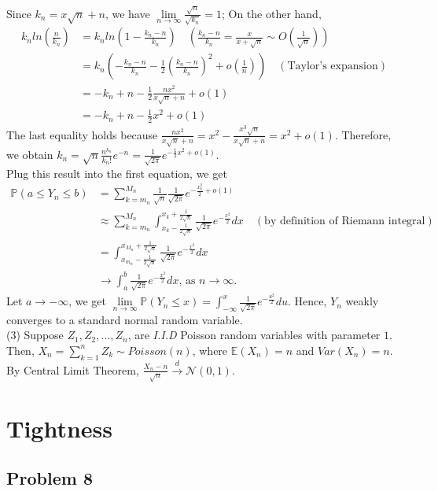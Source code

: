 \documentclass[12pt]{article}
\begin{document}
Since $k_{n}=x\sqrt{n}+n$, we have $\lim\limits_{n\rightarrow\infty}\frac{\sqrt{n}}{\sqrt{k_{n}}}=1$; On the other hand,
\begin{align*}
	k_{n}ln(\frac{n}{k_{n}})&=k_{n}ln(1-\frac{k_{n}-n}{k_{n}})\quad(\frac{k_{n}-n}{k_{n}}=\frac{x}{x+\sqrt{n}}\sim O(\frac{1}{\sqrt{n}}))\\
	&=k_{n}(-\frac{k_{n}-n}{k_{n}}-\frac{1}{2}(\frac{k_{n}-n}{k_{n}})^{2}+o(\frac{1}{n}))\quad(\text{Taylor's expansion})\\
	&=-k_{n}+n-\frac{1}{2}\frac{n x^2}{x\sqrt{n}+n}+o(1)\\
	&=-k_{n}+n-\frac{1}{2}x^2+o(1)
\end{align*}
The last equality holds because $\frac{nx^2}{x\sqrt{n}+n}=x^2-\frac{x^3\sqrt{n}}{x\sqrt{n}+n}=x^2+o(1)$. Therefore, we obtain $k_{n}=\sqrt{n}\frac{n^{k_{n}}}{k_{n}!}e^{-n}=\frac{1}{\sqrt{2\pi}}e^{-\frac{1}{2}x^2+o(1)}$.\\
Plug this result into the first equation, we get
\begin{align*}
\mathbb{P}(a\leqslant Y_{n}\leqslant b)&=\sum_{k=m_{n}}^{M_{n}}\frac{1}{\sqrt{n}}\frac{1}{\sqrt{2\pi}}e^{-\frac{x_{k}^2}{2}+o(1)} \\
&\approx \sum_{k=m_{n}}^{M_{n}}\int_{x_{k}-\frac{1}{2\sqrt{n}}}^{x_{k}+\frac{1}{2\sqrt{n}}} \frac{1}{\sqrt{2\pi}}e^{-\frac{x^2}{2}}dx\quad(\text{by definition of Riemann integral})\\
	&=\int_{x_{m_{n}}-\frac{1}{2\sqrt{n}}}^{x_{M_{n}}+\frac{1}{2\sqrt{n}}} \frac{1}{\sqrt{2\pi}}e^{-\frac{x^2}{2}}dx\\
	& \rightarrow \int_{a}^{b}\frac{1}{\sqrt{2\pi}}e^{-\frac{x^2}{2}}dx\text{, as $n\rightarrow\infty$.}
\end{align*}
Let $a\rightarrow -\infty$, we get $\lim\limits_{n\rightarrow\infty}\mathbb{P}(Y_{n}\leqslant x)=\int_{-\infty}^{x}\frac{1}{\sqrt{2\pi}}e^{-\frac{u^2}{2}}du$. Hence, $Y_{n}$ weakly converges to a standard normal random variable.\\

(3) Suppose $Z_{1},Z_{2},\dots, Z_{n}$, are \emph{I.I.D} Poisson random variables with parameter $1$. Then, $X_{n}=\sum\limits_{k=1}^{n}Z_{k}\sim Poisson(n)$, where $\mathbb{E}(X_{n})=n$ and $Var(X_{n})=n$. By Central Limit Theorem, $\frac{X_{n}-n}{\sqrt{n}}\xrightarrow{d}\mathcal{N}(0,1)$.
\section{Tightness}

	\subsection*{Problem 8}
	
\end{document}
